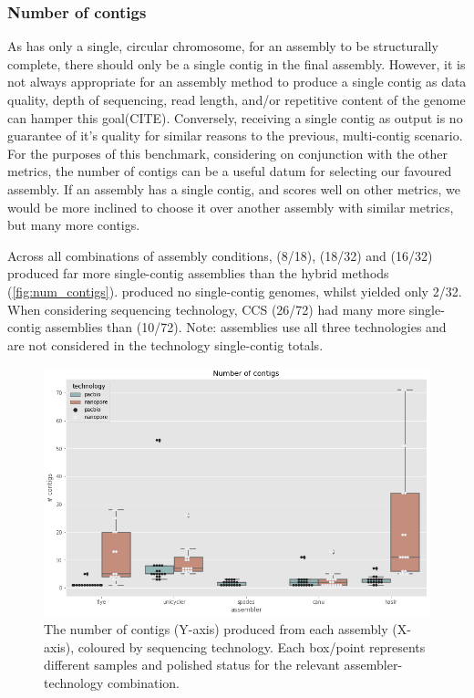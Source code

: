 \subsubsection{Number of contigs}

As \mtb{} has only a single, circular chromosome, for an assembly to be structurally complete, there should only be a single contig in the final assembly. However, it is not always appropriate for an assembly method to produce a single contig as data quality, depth of sequencing, read length, and/or repetitive content of the genome can hamper this goal(CITE). Conversely, receiving a single contig as output is no guarantee of it's quality for similar reasons to the previous, multi-contig scenario. For the purposes of this benchmark, considering on conjunction with the other metrics, the number of contigs can be a useful datum for selecting our favoured assembly. If an assembly has a single contig, and scores well on other metrics, we would be more inclined to choose it over another assembly with similar metrics, but many more contigs.

Across all combinations of assembly conditions,  (8/18),  (18/32) and  (16/32) produced far more single-contig assemblies than the hybrid methods (\autoref{fig:num_contigs}).  produced no single-contig genomes, whilst  yielded only 2/32. When considering sequencing technology, CCS (26/72) had many more single-contig assemblies than \ont{} (10/72). Note:  assemblies use all three technologies and are not considered in the technology single-contig totals.



\begin{figure}
\includegraphics[width=1.0\textwidth]{Chapter2/Figs/num_contigs.png}
\centering
\caption{The number of contigs (Y-axis) produced from each assembly (X-axis), coloured by sequencing technology. Each box/point represents different samples and polished status for the relevant assembler-technology combination.}
\label{fig:num_contigs}
\end{figure}



